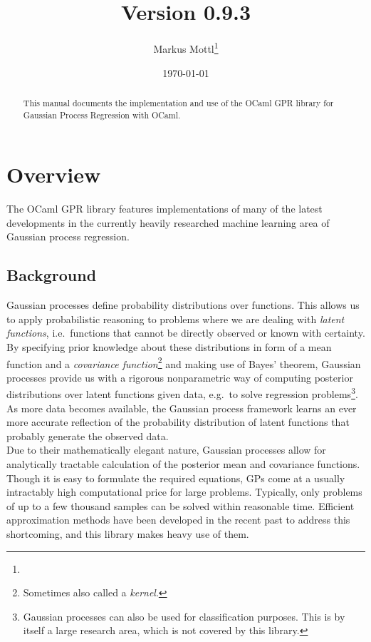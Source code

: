 \documentclass[10pt]{report}
\title{\footahref{http://www.ocaml.info/home/ocaml\_sources.html\#gpr}{Gaussian Process Regression with OCaml}\\Version 0.9.3}
\author{Markus Mottl\footnote{\mail}}
\date{\today}
\begin{document}
\maketitle

\begin{abstract}

This manual documents the implementation and use of the OCaml GPR
library for Gaussian Process Regression with OCaml.

\end{abstract}

\tableofcontents

\chapter{Overview}

The OCaml GPR library features implementations of many of the latest
developments in the currently heavily researched machine learning area of
Gaussian process regression.

\section{Background}

Gaussian processes define probability distributions over functions.  This allows
us to apply probabilistic reasoning to problems where we are dealing with
\emph{latent functions}, i.e.\ functions that cannot be directly observed or
known with certainty.  By specifying prior knowledge about these distributions
in form of a mean function and a \emph{covariance function}\footnote{Sometimes
also called a \emph{kernel}.} and making use of Bayes' theorem, Gaussian
processes provide us with a rigorous nonparametric way of computing posterior
distributions over latent functions given data, e.g.\ to solve regression
problems\footnote{Gaussian processes can also be used for classification
purposes.  This is by itself a large research area, which is not covered by this
library.}.  As more data becomes available, the Gaussian process framework
learns an ever more accurate reflection of the probability distribution of
latent functions that probably generate the observed data.\\

Due to their mathematically elegant nature, Gaussian processes allow for
analytically tractable calculation of the posterior mean and covariance
functions.  Though it is easy to formulate the required equations, GPs come at a
usually intractably high computational price for large problems.  Typically,
only problems of up to a few thousand samples can be solved within reasonable
time.  Efficient approximation methods have been developed in the recent past to
address this shortcoming, and this library makes heavy use of them.\\
\end{document}
